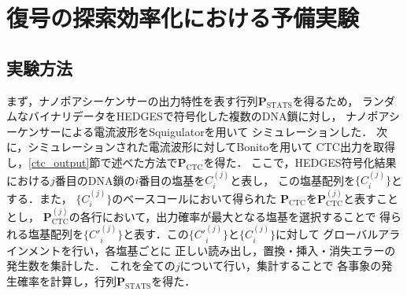 \documentclass[sotsuron]{kuee}
\begin{document}
\appendix
\chapter{復号の探索効率化における予備実験}
\section{実験方法}
まず，ナノポアシーケンサーの出力特性を表す行列$\bm{P}_{\mathrm{STATS}}$を得るため，
ランダムなバイナリデータをHEDGESで符号化した複数のDNA鎖に対し，
ナノポアシーケンサーによる電流波形をSquigulatorを用いて
シミュレーションした．
次に，シミュレーションされた電流波形に対してBonitoを用いて
CTC出力を取得し，\ref{ctc_output}節で述べた方法で$\bm{P}_{\mathrm{CTC}}$を得た．
ここで，HEDGES符号化結果における$j$番目のDNA鎖の$i$番目の塩基を$C_i^{(j)}$と表し，
この塩基配列を$\{C_i^{(j)}\}$とする．また，
$\{C_i^{(j)}\}$のベースコールにおいて得られた
$\bm{P}_{\mathrm{CTC}}$を$\bm{P}_{\mathrm{CTC}}^{(j)}$と表すこととし，
$\bm{P}_{\mathrm{CTC}}^{(j)}$の各行において，出力確率が最大となる塩基を選択することで
得られる塩基配列を$\{C'^{(j)}_i\}$と表す．この$\{C'^{(j)}_i\}$と$\{C_i^{(j)}\}$に対して
グローバルアラインメントを行い，各塩基ごとに
正しい読み出し，置換・挿入・消失エラーの発生数を集計した\cite{GOTOH1982705}．
これを全ての$j$について行い，集計することで
各事象の発生確率を計算し，行列$\bm{P}_{\mathrm{STATS}}$を得た．
\end{document}
